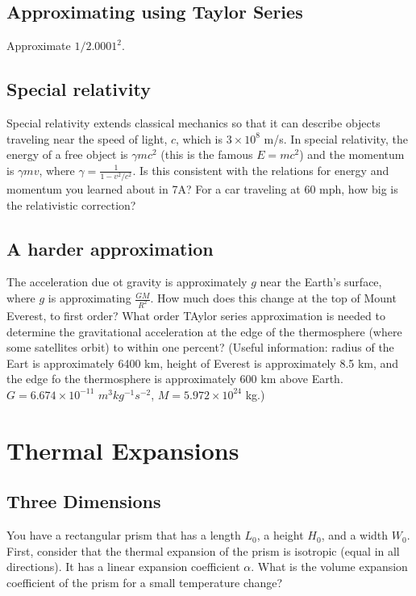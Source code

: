 \documentclass{article}
\begin{document}
\subsection{Approximating using Taylor Series}

Approximate $1/2.0001^2$.

\subsection{Special relativity}

Special relativity extends classical mechanics so that it can describe objects traveling near the speed of light, $c$, which is $3\times10^8$ m/s. In special relativity, the energy of a free object is $\gamma mc^2$ (this is the famous $E=mc^2$) and the momentum is $\gamma mv$, where $\gamma = \frac{1}{1-v^2/c^2}$. Is this consistent with the relations for energy and momentum you learned about in 7A? For a car traveling at 60 mph, how big is the relativistic correction?

\subsection{A harder approximation}

The acceleration due ot gravity is approximately $g$ near the Earth's surface, where $g$ is approximating $\frac{GM}{R^2}$. How much does this change at the top of Mount Everest, to first order? What order TAylor series approximation is needed to determine the gravitational acceleration at the edge of the thermosphere (where some satellites orbit) to within one percent? (Useful information: radius of the Eart is approximately 6400 km, height of Everest is approximately 8.5 km, and the edge fo the thermosphere is approximately 600 km above Earth. $G=6.674\times10^{-11}$ $m^3 kg^{-1} s^{-2}$, $M=5.972\times10^{24}$ kg.)

\newpage

\section{Thermal Expansions}

\subsection{Three Dimensions}

You have a rectangular prism that has a length $L_0$, a height $H_0$, and a width $W_0$. First, consider that the thermal expansion of the prism is isotropic (equal in all directions). It has a linear expansion coefficient $\alpha$. What is the volume expansion coefficient of the prism for a small temperature change?
\end{document}
